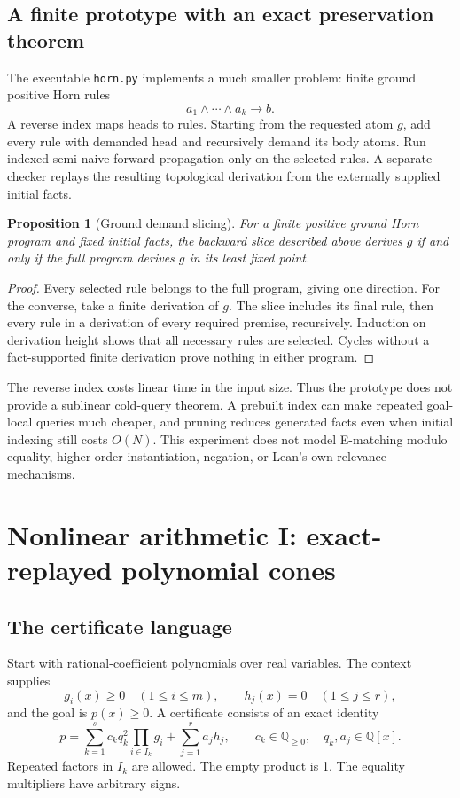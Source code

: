 \documentclass[11pt,a4paper]{article}
\newcommand{\Q}{\mathbb Q}\newcommand{\R}{\mathbb R}\newcommand{\N}{\mathbb N}
\newcommand{\code}[1]{\texttt{#1}}
\newtheorem{proposition}{Proposition}[section]
\begin{document}
\subsection{A finite prototype with an exact preservation theorem}
The executable \code{horn.py} implements a much smaller problem: finite ground positive Horn rules
\[
 a_1\land\cdots\land a_k\longrightarrow b.
\]
A reverse index maps heads to rules. Starting from the requested atom $g$, add every rule with demanded head and recursively demand its body atoms. Run indexed semi-naive forward propagation only on the selected rules. A separate checker replays the resulting topological derivation from the externally supplied initial facts.

\begin{proposition}[Ground demand slicing]
For a finite positive ground Horn program and fixed initial facts, the backward slice described above derives $g$ if and only if the full program derives $g$ in its least fixed point.
\end{proposition}
\begin{proof}
Every selected rule belongs to the full program, giving one direction. For the converse, take a finite derivation of $g$. The slice includes its final rule, then every rule in a derivation of every required premise, recursively. Induction on derivation height shows that all necessary rules are selected. Cycles without a fact-supported finite derivation prove nothing in either program.
\end{proof}

The reverse index costs linear time in the input size. Thus the prototype does not provide a sublinear cold-query theorem. A prebuilt index can make repeated goal-local queries much cheaper, and pruning reduces generated facts even when initial indexing still costs $O(N)$. This experiment does not model E-matching modulo equality, higher-order instantiation, negation, or Lean's own relevance mechanisms.

\section{Nonlinear arithmetic I: exact-replayed polynomial cones}
\subsection{The certificate language}
Start with rational-coefficient polynomials over real variables. The context supplies
\[
 g_i(x)\ge0\quad(1\le i\le m),\qquad h_j(x)=0\quad(1\le j\le r),
\]
and the goal is $p(x)\ge0$. A certificate consists of an exact identity
\begin{equation}\label{eq:cone}
 p=\sum_{k=1}^s c_k q_k^2\prod_{i\in I_k}g_i
       +\sum_{j=1}^r a_jh_j,
 \qquad c_k\in\Q_{\ge0},\quad q_k,a_j\in\Q[x].
\end{equation}
Repeated factors in $I_k$ are allowed. The empty product is 1. The equality multipliers have arbitrary signs.
\end{document}
